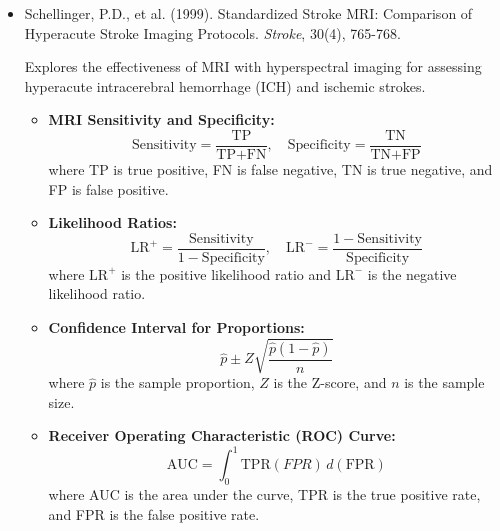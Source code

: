 \documentclass[10pt,svgnames,fragile]{beamer}
\begin{document}
\begin{frame}{}
\tiny
\begin{itemize}
    
    \item Schellinger, P.D., et al. (1999). Standardized Stroke MRI: Comparison of Hyperacute Stroke Imaging Protocols. \textit{Stroke}, 30(4), 765-768. \href{https://consensus.app/papers/standardized-stroke-comparison-hemorrhage-schellinger/8fbc8c749c435c8e94e7af9de90a78aa/?utm_source=chatgpt}{\color{blue}{DOI: 10.1161/01.STR.30.4.765}} \cite{tongStandardizedMRIStroke1999}

    {\color{gray}Explores the effectiveness of MRI with hyperspectral imaging for assessing hyperacute intracerebral hemorrhage (ICH) and ischemic strokes.}
    \begin{itemize} \tiny
    \item \textbf{MRI Sensitivity and Specificity:}
    \[
    \text{Sensitivity} = \frac{\text{TP}}{\text{TP} + \text{FN}}, \quad \text{Specificity} = \frac{\text{TN}}{\text{TN} + \text{FP}}
    \]
    where TP is true positive, FN is false negative, TN is true negative, and FP is false positive.
    \item \textbf{Likelihood Ratios:}
    \[
    \text{LR}^+ = \frac{\text{Sensitivity}}{1 - \text{Specificity}}, \quad \text{LR}^- = \frac{1 - \text{Sensitivity}}{\text{Specificity}}
    \]
    where \( \text{LR}^+ \) is the positive likelihood ratio and \( \text{LR}^- \) is the negative likelihood ratio.
    \item \textbf{Confidence Interval for Proportions:}
    \[
    \hat{p} \pm Z \sqrt{\frac{\hat{p}(1 - \hat{p})}{n}}
    \]
    where \( \hat{p} \) is the sample proportion, \( Z \) is the Z-score, and \( n \) is the sample size.
    \item \textbf{Receiver Operating Characteristic (ROC) Curve:}
    \[
    \text{AUC} = \int_{0}^{1} \text{TPR}(FPR) \, d(\text{FPR})
    \]
    where AUC is the area under the curve, TPR is the true positive rate, and FPR is the false positive rate.
    \end{itemize}

\end{itemize}
\end{frame}
\end{document}
